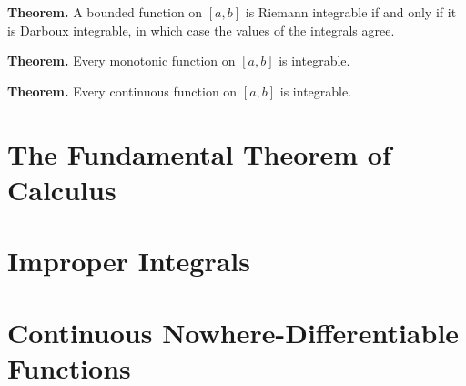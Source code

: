 \documentclass[12pt]{article}
\begin{document}
\textbf{Theorem.} A bounded function on $[a,b]$ is Riemann integrable if and only if it is Darboux integrable, in which case the values of the integrals agree.

\textbf{Theorem.} Every monotonic function on $[a,b]$ is integrable.

\textbf{Theorem.} Every continuous function on $[a,b]$ is integrable.

\section{The Fundamental Theorem of Calculus}

\section{Improper Integrals}

\section{Continuous Nowhere-Differentiable Functions}
\end{document}
